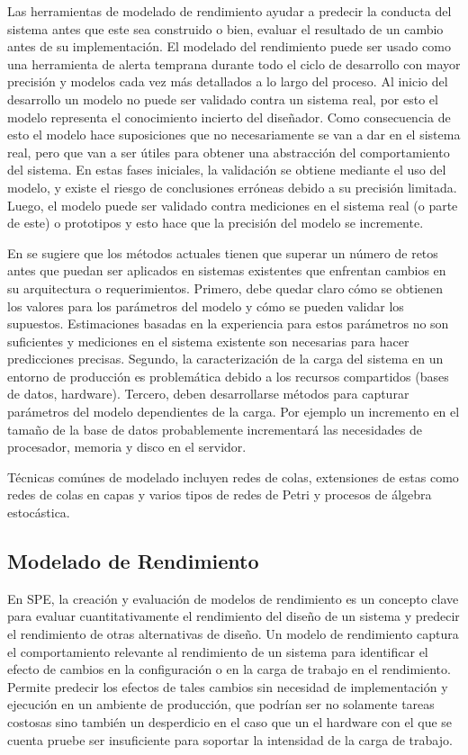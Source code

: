 \documentclass[conference]{IEEEtran}
\begin{document}
Las herramientas de modelado de rendimiento ayudar a predecir la conducta del sistema antes que este sea construido o bien, evaluar el resultado de un cambio antes de su implementación. El modelado del rendimiento puede ser usado como una herramienta de alerta temprana durante todo el ciclo de desarrollo con mayor precisión y modelos cada vez más detallados a lo largo del proceso. Al inicio del desarrollo un modelo no puede ser validado contra un sistema real, por esto el modelo representa el conocimiento incierto del diseñador. Como consecuencia de esto el modelo hace suposiciones que no necesariamente se van a dar en el sistema real, pero que van a ser útiles para obtener una abstracción del comportamiento del sistema. En estas fases iniciales, la validación se obtiene mediante el uso del modelo, y existe el riesgo de conclusiones erróneas debido a su precisión limitada. Luego, el modelo puede ser validado contra mediciones en el sistema real (o parte de este) o prototipos y esto hace que la precisión del modelo se incremente.

En \cite{jit-et-al} se sugiere que los métodos actuales tienen que superar un número de retos antes que puedan ser aplicados en sistemas existentes que enfrentan cambios en su arquitectura o requerimientos. Primero, debe quedar claro cómo se obtienen los valores para los parámetros del modelo y cómo se pueden validar los supuestos. Estimaciones basadas en la experiencia para estos parámetros no son suficientes y mediciones en el sistema existente son necesarias para hacer predicciones precisas. Segundo, la caracterización de la carga del sistema en un entorno de producción es problemática debido a los recursos compartidos (bases de datos, hardware). Tercero, deben desarrollarse métodos para capturar parámetros del modelo dependientes de la carga. Por ejemplo un incremento en el tamaño de la base de datos probablemente incrementará las necesidades de procesador, memoria y disco en el servidor.

Técnicas comúnes de modelado incluyen redes de colas, extensiones de estas como redes de colas en capas y varios tipos de redes de Petri y procesos de álgebra estocástica.


\subsection{Modelado de Rendimiento}
En SPE, la creación y evaluación de modelos de rendimiento es un concepto clave para evaluar cuantitativamente el rendimiento del diseño de un sistema y predecir el rendimiento de otras alternativas de diseño. Un modelo de rendimiento captura el comportamiento relevante al rendimiento de un sistema para identificar el efecto de cambios en la configuración o en la carga de trabajo en el rendimiento. Permite predecir los efectos de tales cambios sin necesidad de implementación y ejecución en un ambiente de producción, que podrían ser no solamente tareas costosas sino también un desperdicio en el caso que un el hardware con el que se cuenta pruebe ser insuficiente para soportar la intensidad de la carga de trabajo.\cite{noorshams}
\end{document}
